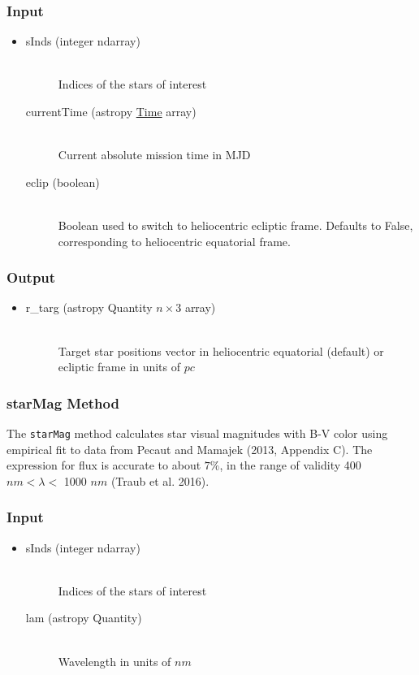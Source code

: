 \documentclass[cleanfoot]{asme2ej}
\begin{document}
\subsubsection*{Input}
\begin{itemize}
\item 
\begin{description}
    \item[sInds (integer ndarray)] \hfill \\ Indices of the stars of interest
    \item[currentTime (astropy \href{http://astropy.readthedocs.org/en/latest/time/index.html}{Time} array)] \hfill \\ Current absolute mission time in MJD
    \item[eclip (boolean)] \hfill \\ Boolean used to switch to heliocentric ecliptic frame. Defaults to False, corresponding to heliocentric equatorial frame.
\end{description}
\end{itemize}

\subsubsection*{Output}
\begin{itemize}
\item
\begin{description}
    \item[r\_targ (astropy Quantity $n\times3$ array)] \hfill \\ Target star positions vector in heliocentric equatorial (default) or ecliptic frame in units of $pc$
\end{description}
\end{itemize}


\subsubsection{starMag Method} \label{sec:starMagtask}
The \verb+starMag+ method calculates star visual magnitudes with B-V color using empirical fit to data from Pecaut and Mamajek (2013, Appendix C). The expression for flux is accurate to about $7\%$, in the range of validity 400 $ nm < \lambda < $ 1000 $ nm $ (Traub et al. 2016).

\subsubsection*{Input}
\begin{itemize}
\item 
\begin{description}
    \item[sInds (integer ndarray)] \hfill \\ Indices of the stars of interest
    \item[lam (astropy Quantity)] \hfill \\ Wavelength in units of $ nm $
\end{description}
\end{itemize}
\end{document}
